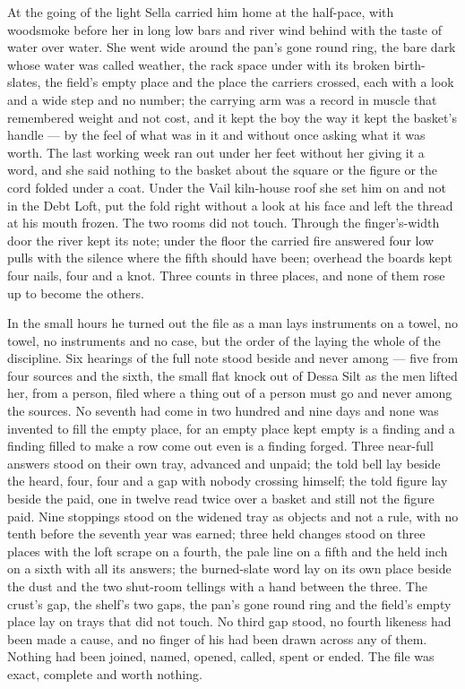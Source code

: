 \scenebreak

At the going of the light Sella carried him home at the half-pace, with woodsmoke before her in long low bars and river wind behind with the taste of water over water. She went wide around the pan's gone round ring, the bare dark  whose water was called weather, the rack space under  with its broken birth-slates, the field's empty place and the place the carriers crossed, each with a look and a wide step and no number; the carrying arm was a record in muscle that remembered weight and not cost, and it kept the boy the way it kept the basket's handle --- by the feel of what was in it and without once asking what it was worth. The last working week ran out under her feet without her giving it a word, and she said nothing to the basket about the square or the figure or the cord folded under a coat. Under the Vail kiln-house roof she set him on  and not in the Debt Loft, put the fold right without a look at his face and left the thread at his mouth frozen. The two rooms did not touch. Through the finger's-width door the river kept its note; under the floor the carried fire answered four low pulls with the silence where the fifth should have been; overhead the boards kept four nails, four and a knot. Three counts in three places, and none of them rose up to become the others.

In the small hours he turned out the file as a man lays instruments on a towel, no towel, no instruments and no case, but the order of the laying the whole of the discipline. Six hearings of the full note stood beside and never among --- five from four sources and the sixth, the small flat knock out of Dessa Silt as the men lifted her, from a person, filed where a thing out of a person must go and never among the sources. No seventh had come in two hundred and nine days and none was invented to fill the empty place, for an empty place kept empty is a finding and a finding filled to make a row come out even is a finding forged. Three near-full answers stood on their own tray, advanced and unpaid; the told bell lay beside the heard, four, four and a gap with nobody crossing himself; the told figure lay beside the paid, one in twelve read twice over a basket and still not the figure paid. Nine stoppings stood on the widened tray as objects and not a rule, with no tenth before the seventh year was earned; three held changes stood on three places with the loft scrape on a fourth, the pale line on a fifth and the held inch on a sixth with all its answers; the burned-slate word lay on its own place beside the dust and the two shut-room tellings with a hand between the three. The crust's gap, the shelf's two gaps, the pan's gone round ring and the field's empty place lay on trays that did not touch. No third gap stood, no fourth likeness had been made a cause, and no finger of his had been drawn across any of them. Nothing had been joined, named, opened, called, spent or ended. The file was exact, complete and worth nothing.

